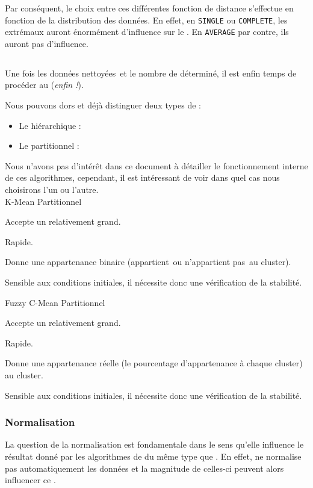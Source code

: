 Par conséquent, le choix entre ces différentes fonction de distance s'effectue en fonction de la distribution des données. En effet, en \texttt{SINGLE} ou \texttt{COMPLETE}, les extrémaux auront énormément d'influence sur le . En \texttt{AVERAGE} par contre, ils auront \apriori pas d'influence.

\subsection{}
Une fois les données \og nettoyées\fg~et le nombre de  déterminé, il est enfin temps de procéder au  (\textsl{enfin !}).

Nous pouvons dors et déjà distinguer deux types de  :
\todo{}
\begin{itemize}
	\item Le  hiérarchique :
	\item Le  partitionnel :
\end{itemize}

Nous n'avons pas d'intérêt dans ce document à détailler le fonctionnement interne de ces algorithmes, cependant, il est intéressant de voir dans quel cas nous choisirons l'un ou l'autre.\\

\clusterAlgorithm
{K-Mean}
{Partitionnel}
{
	\item Accepte un  relativement grand.
	\item Rapide.
	\item Donne une appartenance binaire (\ie \og appartient\fg~ou \og n'appartient pas\fg~au cluster).
}
{
	\item Sensible aux conditions initiales, il nécessite donc une vérification de la stabilité.
}

\clusterAlgorithm
{Fuzzy C-Mean}
{Partitionnel}
{
	\item Accepte un  relativement grand.
	\item Rapide.
	\item Donne une appartenance réelle (\ie le pourcentage d'appartenance à chaque cluster) au cluster.
}
{
	\item Sensible aux conditions initiales, il nécessite donc une vérification de la stabilité.
}

\subsubsection{Normalisation}
La question de la normalisation est fondamentale dans le sens qu'elle influence le résultat donné par les algorithmes de  du même type que . En effet,  ne normalise pas automatiquement les données et la magnitude de celles-ci peuvent alors influencer ce .

